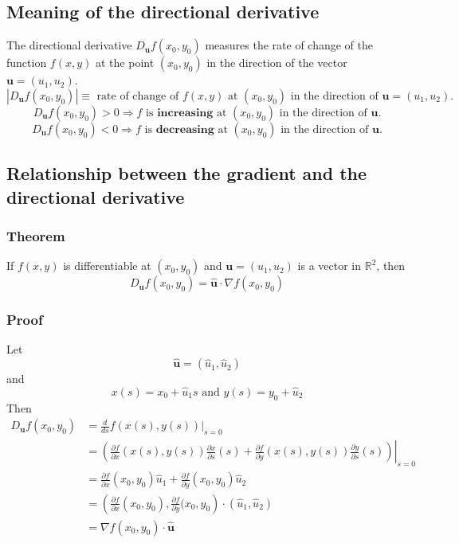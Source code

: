 \documentclass[11pt]{article}
\newcommand{\reals}{\mathbb{R}}
\renewcommand{\vec}[1]{\mathbf{#1}}
\begin{document}
\subsection{Meaning of the directional derivative}
The directional derivative $D_\vec{u}f(x_0, y_0)$ measures the rate of change of the function $f(x, y)$ at the point $(x_0, y_0)$ in the direction of the vector $\vec{u} = (u_1, u_2)$.
\[ |D_\vec{u}f(x_0, y_0)| \equiv \text{ rate of change  of } f(x, y) \text{ at } (x_0, y_0) \text{ in the direction of } \vec{u} = (u_1, u_2). \]
\[ D_\vec{u}f(x_0, y_0) > 0 \Rightarrow f \text{ is } \textbf{increasing} \text{ at } (x_0, y_0) \text{ in the direction of } \vec{u}. \]
\[ D_\vec{u}f(x_0, y_0) < 0 \Rightarrow f \text{ is } \textbf{decreasing} \text{ at } (x_0, y_0) \text{ in the direction of } \vec{u}. \]

\subsection{Relationship between the gradient and the directional derivative}
\subsubsection{Theorem}
If $f(x, y)$ is differentiable at $(x_0, y_0)$ and $\vec{u} = (u_1, u_2)$ is a vector in $\reals^2$, then
\[ D_\vec{u}f(x_0, y_0) = \vec{\hat{u}} \cdot \nabla f(x_0, y_0) \]

\subsubsection{Proof}
Let 
\[ \vec{\hat{u}} = (\hat{u}_1, \hat{u}_2) \]
and
\[ x(s) = x_0 + \hat{u}_1 s \text{ and } y(s) = y_0 + \hat{u}_2  \]
Then
\begin{align*}
D_\vec{u} f(x_0, y_0) &= \frac{d}{ds} f(x(s), y(s)) |_{s=0} \\
&= \left. \left( \frac{\partial f}{\partial x}( x(s), y(s)) \frac{\partial x}{\partial s}(s) +  \frac{\partial f}{\partial y}( x(s), y(s)) \frac{\partial y}{\partial s}(s) \right) \right|_{s=0} \\
&= \frac{\partial f}{\partial x}(x_0, y_0) \hat{u}_1 + \frac{\partial f}{\partial y}(x_0, y_0) \hat{u}_2 \\
&= \left( \frac{\partial f}{\partial x}(x_0, y_0), \frac{\partial f}{\partial y}(x_0, y_0 \right) \cdot \left( \hat{u}_1, \hat{u}_2 \right) \\
&= \nabla f(x_0, y_0) \cdot \vec{\hat{u}}
\end{align*}
\end{document}
